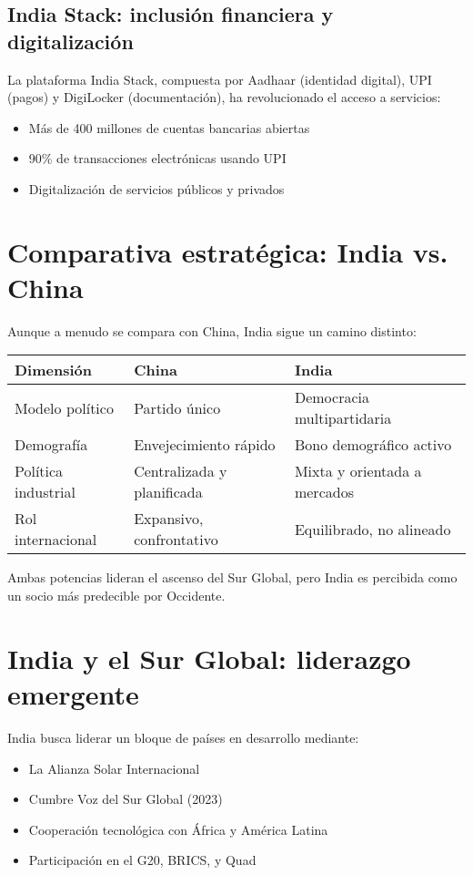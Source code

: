 \documentclass[12pt]{article}
\begin{document}
\subsection*{India Stack: inclusión financiera y digitalización}

La plataforma India Stack, compuesta por Aadhaar (identidad digital), UPI (pagos) y DigiLocker (documentación), ha revolucionado el acceso a servicios:

\begin{itemize}
  \item Más de 400 millones de cuentas bancarias abiertas
  \item 90\% de transacciones electrónicas usando UPI
  \item Digitalización de servicios públicos y privados
\end{itemize}

\section{Comparativa estratégica: India vs. China}

Aunque a menudo se compara con China, India sigue un camino distinto:

\begin{tabular}{|p{5cm}|p{5cm}|p{5cm}|}
\hline
\textbf{Dimensión} & \textbf{China} & \textbf{India} \\
\hline
Modelo político & Partido único & Democracia multipartidaria \\
\hline
Demografía & Envejecimiento rápido & Bono demográfico activo \\
\hline
Política industrial & Centralizada y planificada & Mixta y orientada a mercados \\
\hline
Rol internacional & Expansivo, confrontativo & Equilibrado, no alineado \\
\hline
\end{tabular}

Ambas potencias lideran el ascenso del Sur Global, pero India es percibida como un socio más predecible por Occidente.

\section{India y el Sur Global: liderazgo emergente}

India busca liderar un bloque de países en desarrollo mediante:

\begin{itemize}
  \item La Alianza Solar Internacional
  \item Cumbre Voz del Sur Global (2023)
  \item Cooperación tecnológica con África y América Latina
  \item Participación en el G20, BRICS, y Quad
\end{itemize}
\end{document}
